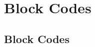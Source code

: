 \documentclass[../Main.tex]{subfiles}
\begin{document}
\chapter{Block Codes}

\intro{

}

\section{Block Codes}
\end{document}
